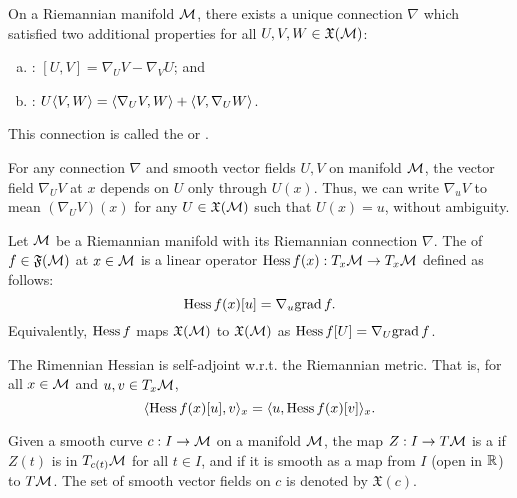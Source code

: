 \documentclass[11pt,a4paper]{article}
\begin{document}
\begin{proposition}
On a Riemannian manifold $\mathcal{M}$, there exists a unique connection $\nabla$ which satisfied two additional properties for all $U,V,W\in\mathfrak{X}(\mathcal{M})$:
\begin{enumerate}[(d)]
    \item {}: $[U,V] = \nabla_U V - \nabla_V U$; and
    \item {}: $U\langle V, W \rangle = \langle \nabla_U V, W \rangle + \langle V, \nabla_U W \rangle$.
\end{enumerate}
This connection is called the  or .
\end{proposition}

\begin{proposition}
For any connection $\nabla$ and smooth vector fields $U, V$ on manifold $\mathcal{M}$, the vector field $\nabla_U V$ at $x$ depends on $U$ only through $U(x)$. Thus, we can write $\nabla_u V$ to mean $(\nabla_U V)(x)$ for any $U\in\mathfrak{X}(\mathcal{M})$ such that $U(x) = u$, without ambiguity.
\end{proposition}

\begin{definition}
Let $\mathcal{M}$ be a Riemannian manifold with its Riemannian connection $\nabla$. The  of $f\in \mathfrak{F}(\mathcal{M})$ at $x\in\mathcal{M}$ is a linear operator $\text{Hess}\, f(x):T_x\mathcal{M}\rightarrow T_x\mathcal{M}$ defined as follows:
\begin{equation*}
    \text{Hess}\, f(x)[u] = \nabla_u \text{grad}\, f.
\end{equation*}
Equivalently, $\text{Hess}\, f$ maps $\mathfrak{X}(\mathcal{M})$ to $\mathfrak{X}(\mathcal{M})$ as $\text{Hess}\, f[U] = \nabla_U\text{grad}\, f$.
\end{definition}

\begin{proposition}
The Rimennian Hessian is self-adjoint w.r.t. the Riemannian metric. That is, for all $x\in \mathcal{M}$ and $u,v\in T_x\mathcal{M}$,
\begin{equation*}
\langle \text{Hess}\, f(x)[u], v \rangle_x = \langle u, \text{Hess}\, f(x)[v] \rangle_x.
\end{equation*}
\end{proposition}

\begin{definition}
Given a smooth curve $c:I\rightarrow \mathcal{M}$ on a manifold $\mathcal{M}$, the map $Z:I\rightarrow T\mathcal{M}$ is a  if $Z(t)$ is in $T_{c(t)}\mathcal{M}$ for all $t\in I$, and if it is smooth as a map from $I$ (open in $\mathbb{R}$) to $T\mathcal{M}$. The set of smooth vector fields on $c$ is denoted by $\mathfrak{X}(c)$.
\end{definition}
\end{document}
